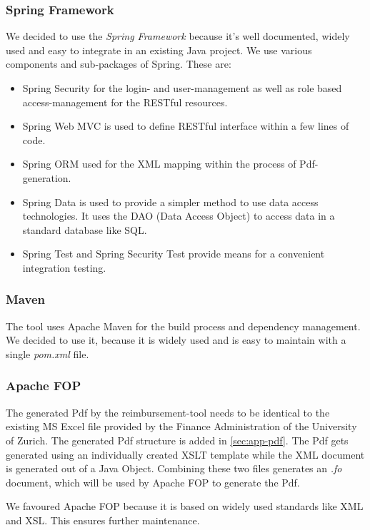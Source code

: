 \subsubsection{Spring Framework}
We decided to use the \textit{Spring Framework}\cite{spring} because it's well documented, widely used and easy to integrate in an existing Java project. We use various components and sub-packages of Spring. These are:
\begin{itemize}
	\item Spring Security for the login- and user-management as well as role based access-management for the RESTful resources.
	\item Spring Web MVC is used to define RESTful interface within a few lines of code.
	\item Spring ORM used for the XML mapping within the process of Pdf-generation.
	\item Spring Data is used to provide a simpler method to use data access technologies. It uses the DAO (Data Access Object) \cite{dao} to access data in a standard database like SQL.
	\item Spring Test and Spring Security Test provide means for a convenient integration testing.
\end{itemize}

\subsubsection{Maven}
The tool uses Apache Maven\cite{maven} for the build process and dependency management. We decided to use it, because it is widely used and is easy to maintain with a single \textit{pom.xml} file.

\subsubsection{Apache FOP}
The generated Pdf by the reimbursement-tool needs to be identical to the existing MS Excel file provided by the Finance Administration of the University of Zurich. The generated Pdf structure is added in \ref{sec:app-pdf}.\newline
The Pdf gets generated using an individually created XSLT template while the XML document is generated out of a Java Object. Combining these two files generates an \textit{.fo} document, which will be used by Apache FOP \cite{apache-fop} to generate the Pdf.\par
We favoured Apache FOP because it is based on widely used standards like XML and XSL. This ensures further maintenance.

